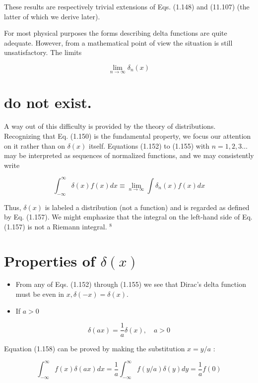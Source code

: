 \documentclass[10pt]{article}
\begin{document}
These results are respectively trivial extensions of Eqs. (1.148) and (11.107) (the latter of which we derive later).

For most physical purposes the forms describing delta functions are quite adequate. However, from a mathematical point of view the situation is still unsatisfactory. The limits

$$
\lim _{n \rightarrow \infty} \delta_{n}(x)
$$

\section*{do not exist.}
A way out of this difficulty is provided by the theory of distributions. Recognizing that Eq. (1.150) is the fundamental property, we focus our attention on it rather than on $\delta(x)$ itself. Equations (1.152) to (1.155) with $n=1,2,3 \ldots$ may be interpreted as sequences of normalized functions, and we may consistently write


\begin{equation*}
\int_{-\infty}^{\infty} \delta(x) f(x) d x \equiv \lim _{n \rightarrow \infty} \int \delta_{n}(x) f(x) d x \tag{1.157}
\end{equation*}


Thus, $\delta(x)$ is labeled a distribution (not a function) and is regarded as defined by Eq. (1.157). We might emphasize that the integral on the left-hand side of Eq. (1.157) is not a Riemann integral. ${ }^{8}$

\section*{Properties of $\delta(x)$}
\begin{itemize}
  \item From any of Eqs. (1.152) through (1.155) we see that Dirac's delta function must be even in $x, \delta(-x)=\delta(x)$.
  \item If $a>0$
\end{itemize}


\begin{equation*}
\delta(a x)=\frac{1}{a} \delta(x), \quad a>0 \tag{1.158}
\end{equation*}


Equation (1.158) can be proved by making the substitution $x=y / a$ :

$$
\int_{-\infty}^{\infty} f(x) \delta(a x) d x=\frac{1}{a} \int_{-\infty}^{\infty} f(y / a) \delta(y) d y=\frac{1}{a} f(0)
$$
\end{document}
